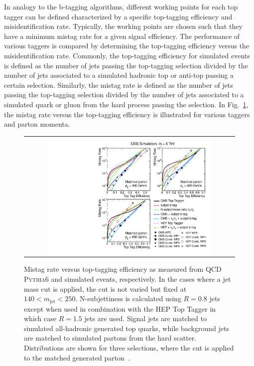In analogy to the b-tagging algorithms, different working points for each top tagger can be defined characterized by a specific top-tagging efficiency and misidentification rate. Typically, the working points are chosen such that they have a minimum mistag rate for a given signal efficiency. The performance of various taggers is compared by determining the top-tagging efficiency versus the misidentification rate. Commonly, the top-tagging efficiency for simulated events is defined as the number of jets passing the top-tagging selection divided by the number of jets associated to a simulated hadronic top or anti-top passing a certain \pt selection. Similarly, the mistag rate is defined as the number of jets passing the top-tagging selection divided by the number of jets associated to a simulated quark or gluon from the hard process passing the \pt selection. In Fig.~\ref{fig:boosted_top_roc}, the mistag rate versus the top-tagging efficiency is illustrated for various taggers and parton momenta.
\begin{figure}[!t] 
  \centering 
  \begin{tabular}{c}
    \includegraphics[width=0.8\textwidth]{figures/TopTag_ROC_Curves.pdf}  
  \end{tabular}
  \caption{Mistag rate versus top-tagging efficiency as measured from QCD \textsc{Pythia6} and \powheg \ttbar simulated events, respectively. In the cases where a jet mass cut is applied, the cut is not varied but fixed at $140 < m_\mathrm{jet} < 250$\gev. N-subjettiness is calculated using $R = 0.8$ jets except when used in combination with the HEP Top Tagger in which case $R = 1.5$ jets are used. Signal jets are matched to simulated all-hadronic generated top quarks, while background jets are matched to simulated partons from the hard scatter. Distributions are shown for three \pt selections, where the \pt cut is applied to the matched generated parton~\cite{CMS-PAS-JME-13-007}.}
  \label{fig:boosted_top_roc}
\end{figure}
